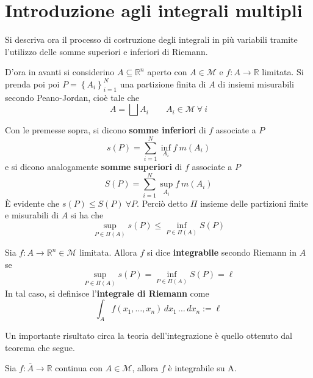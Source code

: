\section{Introduzione agli integrali multipli}
Si descriva ora il processo di costruzione degli integrali in più variabili tramite l'utilizzo delle somme superiori e inferiori di Riemann.

D'ora in avanti si considerino $A \subseteq \mathbb{R}^n$ aperto con $A \in \mathcal{M}$ e $f:A \to \mathbb{R}$ limitata. Si prenda poi poi $P=\left\{ A_i \right\}_{i=1}^{N}$ una partizione finita di $A$ di insiemi misurabili secondo Peano-Jordan, cioè tale che
    \begin{equation*}
    A= \bigsqcup A_i \qquad A_i \in \mathcal{M}\ \forall\ i
    \end{equation*}
\begin{definition} \label{Def: Somme di Riemann}
Con le premesse sopra, si dicono \textbf{somme inferiori} di $f$ associate a $P$
\begin{equation*}
    s(P)= \sum\limits_{i=1}^{N}\inf_{A_i} f\ m(A_i)
\end{equation*}
e si dicono analogamente \textbf{somme superiori} di $f$ associate a $P$
\begin{equation*}
    S(P)= \sum\limits_{i=1}^{N}\sup_{A_i}f\ m(A_i)
\end{equation*}
È evidente che $s(P) \leq S(P)\ \forall P$.
Perciò detto $\Pi$ insieme delle partizioni finite e misurabili di $A$ si ha che
\begin{equation*}
    \sup_{P \in \Pi(A)} s(P) \leq \inf_{P \in \Pi(A)} S(P)
\end{equation*}
\end{definition}
\begin{definition} \label{Def: Integrale e integrabilità}
    Sia $f: A \to \mathbb{R}^n \in \mathcal{M}$ limitata. Allora $f$ si dice \textbf{integrabile} secondo Riemann in $A$ se 
    \begin{equation*}
        \sup_{P \in \Pi(A)} s(P) = \inf_{P \in \Pi(A)} S(P)= \ell
    \end{equation*}
    In tal caso, si definisce l'\textbf{integrale di Riemann} come
    \begin{equation*}
        \int_A{f(x_1, \dots, x_n)}\,dx_1\,\dots\,dx_n := \ell
    \end{equation*}
\end{definition}
Un importante risultato circa la teoria dell'integrazione è quello ottenuto dal teorema che segue.
\begin{theorem} \label{Teo: Integrabilità di funzioni continue}
    Sia $f: \overline{A} \to \mathbb{R}$ continua con $A \in \mathcal{M}$, allora $f$ è integrabile su A.
\end{theorem}
